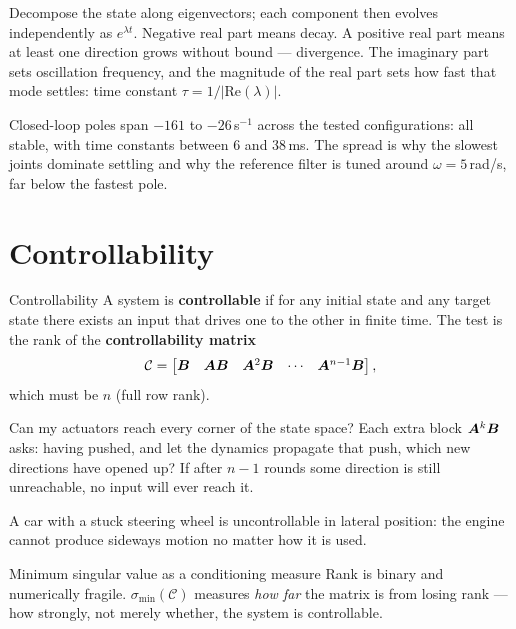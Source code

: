 \begin{intuition}
Decompose the state along eigenvectors; each component then evolves independently as $e^{\lambda t}$.
Negative real part means decay. A positive real part means at least one direction grows without bound ---
divergence. The imaginary part sets oscillation frequency, and the magnitude of the real part sets how
fast that mode settles: time constant $\tau = 1/|\mathrm{Re}(\lambda)|$.
\end{intuition}

\begin{inproject}
Closed-loop poles span $-161$ to $-26$\,s$^{-1}$ across the tested configurations: all stable, with time
constants between 6 and 38\,ms. The spread is why the slowest joints dominate settling and why the
reference filter is tuned around $\omega = 5$\,rad/s, far below the fastest pole.
\end{inproject}

\section{Controllability}

\begin{definition}{Controllability}
A system is \textbf{controllable} if for any initial state and any target state there exists an input that
drives one to the other in finite time. The test is the rank of the \textbf{controllability matrix}
\[
\mathcal{C} = \begin{bmatrix}\bm{B} & \bm{A}\bm{B} & \bm{A}^2\bm{B} & \cdots & \bm{A}^{n-1}\bm{B}\end{bmatrix},
\]
which must be $n$ (full row rank).
\end{definition}

\begin{intuition}
Can my actuators reach every corner of the state space? Each extra block $\bm{A}^k\bm{B}$ asks: having pushed,
and let the dynamics propagate that push, which new directions have opened up? If after $n{-}1$ rounds some
direction is still unreachable, no input will ever reach it.

A car with a stuck steering wheel is uncontrollable in lateral position: the engine cannot produce sideways
motion no matter how it is used.
\end{intuition}

\begin{definition}{Minimum singular value as a conditioning measure}
Rank is binary and numerically fragile. $\sigma_{\min}(\mathcal{C})$ measures \emph{how far} the matrix is
from losing rank --- how strongly, not merely whether, the system is controllable.
\end{definition}

